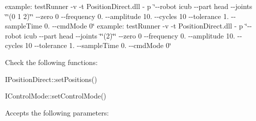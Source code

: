 example\+: test\+Runner -\/v -\/t Position\+Direct.\+dll -\/ p \char`\"{}-\/-\/robot icub -\/-\/part head -\/-\/joints \char`\"{}\char`\"{}(0 1 2)\char`\"{}\char`\"{} -\/-\/zero 0 -\/-\/frequency 0. -\/-\/amplitude 10. -\/-\/cycles 10 -\/-\/tolerance 1. -\/-\/sample\+Time 0. -\/-\/cmd\+Mode 0\char`\"{} example\+: test\+Runner -\/v -\/t Position\+Direct.\+dll -\/ p \char`\"{}-\/-\/robot icub -\/-\/part head -\/-\/joints \char`\"{}\char`\"{}(2)\char`\"{}\char`\"{} -\/-\/zero 0 -\/-\/frequency 0. -\/-\/amplitude 10. -\/-\/cycles 10 -\/-\/tolerance 1. -\/-\/sample\+Time 0. -\/-\/cmd\+Mode 0\char`\"{}

Check the following functions\+: \begin{DoxyItemize}
\item I\+Position\+Direct\+::set\+Positions() \item I\+Control\+Mode\+::set\+Control\+Mode()\end{DoxyItemize}
Accepts the following parameters\+: \tabulinesep=1mm
